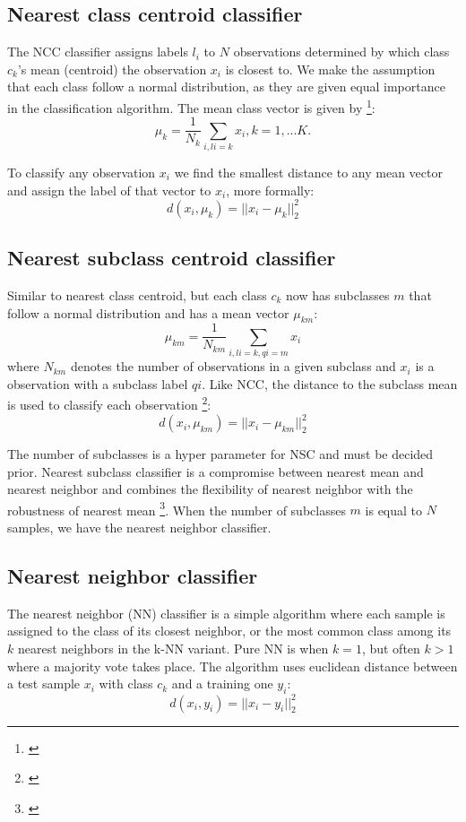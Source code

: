 \documentclass[journal]{IEEEtran}
\begin{document}
\subsection{Nearest class centroid classifier}

The NCC classifier assigns labels $l_{i}$ to $N$ observations determined by which class $c_{k}$'s mean (centroid) the observation $x_{i}$ is closest to. We make the assumption that each class follow a normal distribution, as they are given equal importance in the classification algorithm. The mean class vector is given by \footnote{\cite{Iosifidis2017}}: $$ \mu_{k} = \frac{1}{N_{k}} \sum_{i,li=k}^{} x_{i}, k = 1, ... K.$$

To classify any observation $x_{i}$ we find the smallest distance to any mean vector and assign the label of that vector to $x_{i}$, more formally: $$ d(x_{i},\mu_{k}) = ||x_{i}-\mu_{k}||^2_{2} $$

\subsection{Nearest subclass centroid classifier}

Similar to nearest class centroid, but each class $c_{k}$ now has subclasses $m$ that follow a normal distribution and has a mean vector $\mu_{km}$: $$ \mu_{km} = \frac{1}{N_{km}} \sum_{i,li=k, qi=m}^{} x_{i} $$ where $N_{km}$ denotes the number of observations in a given subclass and $x_{i}$ is a observation with a subclass label $qi$. Like NCC, the distance to the subclass mean is used to classify each observation \footnote{\cite{Iosifidis2017}}: $$ d(x_{i},\mu_{km}) = ||x_{i}-\mu_{km}||^2_{2} $$

The number of subclasses is a hyper parameter for NSC and must be decided prior. Nearest subclass classifier is a compromise between nearest mean and nearest neighbor and combines the flexibility of nearest neighbor with the robustness of nearest mean \footnote{\cite{Veenman2005}}. When the number of subclasses $m$ is equal to $N$ samples, we have the nearest neighbor classifier.

\subsection{Nearest neighbor classifier}

The nearest neighbor (NN) classifier is a simple algorithm where each sample is assigned to the class of its closest neighbor, or the most common class among its $k$ nearest neighbors in the k-NN variant. Pure NN is when $k=1$, but often $k>1$ where a majority vote takes place. The algorithm uses euclidean distance between a test sample $x_{i}$ with class $c_{k}$ and a training one $y_{i}$: $$ d(x_{i},y_{i}) = ||x_{i}-y_{i}||^2_{2} $$
\end{document}
